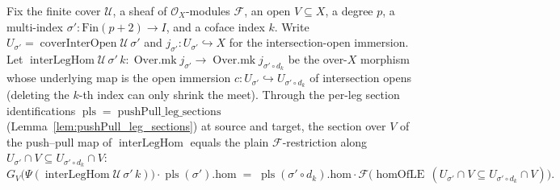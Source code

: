 \begin{lemma}
  \label{lem:pushPull_interLegHom_sections}
  Fix the finite cover \(\mathcal{U}\), a sheaf of \(\mathcal{O}_X\)-modules \(\mathcal{F}\), an
  open \(V \subseteq X\), a degree \(p\), a multi-index \(\sigma' : \mathrm{Fin}(p+2) \to I\), and a
  coface index \(k\). Write \(U_{\sigma'} = \operatorname{coverInterOpen}\mathcal{U}\,\sigma'\) and
  \(j_{\sigma'} : U_{\sigma'} \hookrightarrow X\) for the intersection-open immersion. Let
  \(\operatorname{interLegHom}\mathcal{U}\,\sigma'\,k : \operatorname{Over.mk} j_{\sigma'} \to
  \operatorname{Over.mk} j_{\sigma' \circ d_k}\) be the over-\(X\) morphism whose underlying map is
  the open immersion \(c : U_{\sigma'} \hookrightarrow U_{\sigma' \circ d_k}\) of intersection opens
  (deleting the \(k\)-th index can only shrink the meet). Through the per-leg section
  identifications \(\operatorname{pls} = \operatorname{pushPull\_leg\_sections}\)
  (Lemma~\ref{lem:pushPull_leg_sections}) at source and target, the section over \(V\) of the
  push--pull map of \(\operatorname{interLegHom}\) equals the plain \(\mathcal{F}\)-restriction along
  \(U_{\sigma'} \cap V \subseteq U_{\sigma' \circ d_k} \cap V\):
  \[
    G_V\bigl(\Psi(\operatorname{interLegHom}\mathcal{U}\,\sigma'\,k)\bigr)\cdot
      \operatorname{pls}(\sigma').\mathrm{hom}
      \;=\;
    \operatorname{pls}(\sigma' \circ d_k).\mathrm{hom}\cdot
      \mathcal{F}\bigl(\operatorname{homOfLE}\,(U_{\sigma'} \cap V \subseteq
        U_{\sigma' \circ d_k} \cap V)\bigr).
  \]
\end{lemma}
